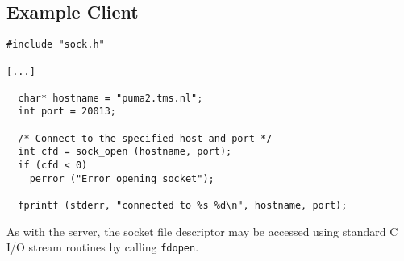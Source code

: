 \subsection{Example Client}

\begin{verbatim}
#include "sock.h"

[...]

  char* hostname = "puma2.tms.nl";
  int port = 20013;

  /* Connect to the specified host and port */
  int cfd = sock_open (hostname, port);
  if (cfd < 0)
    perror ("Error opening socket");

  fprintf (stderr, "connected to %s %d\n", hostname, port);
\end{verbatim}
As with the server, the socket file descriptor may be accessed using
standard C I/O stream routines by calling {\tt fdopen}.
